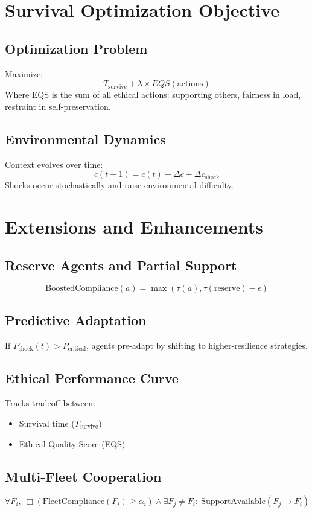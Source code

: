 \documentclass[11pt]{article}
\begin{document}
\section{Survival Optimization Objective}
\subsection{Optimization Problem}
Maximize:
\[
T_{\text{survive}} + \lambda \times EQS(\text{actions})
\]
Where EQS is the sum of all ethical actions: supporting others, fairness in load, restraint in self-preservation.

\subsection{Environmental Dynamics}
Context evolves over time:
\[
c(t+1) = c(t) + \Delta c \pm \Delta c_{\text{shock}}
\]
Shocks occur stochastically and raise environmental difficulty.

\section{Extensions and Enhancements}
\subsection{Reserve Agents and Partial Support}
\[
\text{BoostedCompliance}(a) = \max(\tau(a), \tau(\text{reserve}) - \epsilon)
\]

\subsection{Predictive Adaptation}
If $P_{\text{shock}}(t) > P_{\text{critical}}$, agents pre-adapt by shifting to higher-resilience strategies.

\subsection{Ethical Performance Curve}
Tracks tradeoff between:
\begin{itemize}
  \item Survival time ($T_{\text{survive}}$)
  \item Ethical Quality Score (EQS)
\end{itemize}

\subsection{Multi-Fleet Cooperation}
\[
\forall F_i,\ \Box(\text{FleetCompliance}(F_i) \geq \alpha_i) \land \exists F_j \neq F_i:\ \text{SupportAvailable}(F_j \rightarrow F_i)
\]
\end{document}
